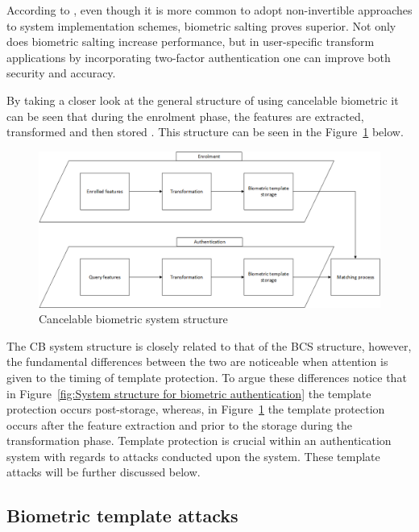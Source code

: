 According to \cite{Rathgeb2011}, even though it is more common to adopt non-invertible approaches to system implementation schemes, biometric salting proves superior. Not only does biometric salting increase performance, but in user-specific transform applications by incorporating two-factor authentication one can improve both security and accuracy.

By taking a closer look at the general structure of using cancelable biometric it can be seen that during the enrolment phase, the features are extracted, transformed and then stored \citep{Patel2015}. This structure can be seen in the Figure~\ref{fig:Cancelable biometric system structure} below.


\begin{figure}[htbp!] 
\centering    
\includegraphics[width=1.0\textwidth]{Chapter2/Figs/Figure2-2.png}
\caption[Cancelable biometric system structure]{Cancelable biometric system structure}
\label{fig:Cancelable biometric system structure}
\end{figure}

The CB system structure is closely related to that of the BCS structure, however, the fundamental differences between the two are noticeable when attention is given to the timing of template protection. To argue these differences notice that in Figure~\ref{fig:System structure for biometric authentication} the template protection occurs post-storage, whereas, in Figure~\ref{fig:Cancelable biometric system structure} the template protection occurs after the feature extraction and prior to the storage during the transformation phase. Template protection is crucial within an authentication system with regards to attacks conducted upon the system. These template attacks will be further discussed below.

    \subsection{ Biometric template attacks}
    
